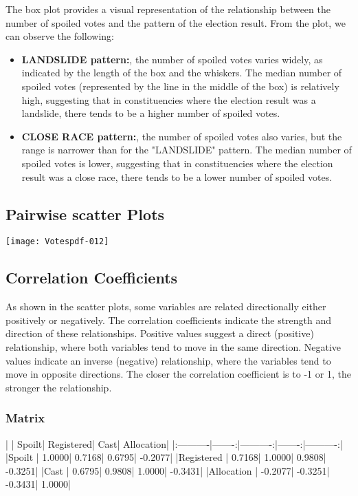 \documentclass[fleqn,a4paper,12pt]{article}
\begin{document}
The box plot provides a visual representation of the relationship between the number of spoiled votes and the pattern of the election result.
From the plot, we can observe the following:
\begin{itemize}
\item \textbf{LANDSLIDE pattern:}, the number of spoiled votes varies widely, as indicated by the length of the box and the whiskers. The median number of spoiled votes (represented by the line in the middle of the box) is relatively high, suggesting that in constituencies where the election result was a landslide, there tends to be a higher number of spoiled votes.
\item \textbf{CLOSE RACE pattern:}, the number of spoiled votes also varies, but the range is narrower than for the "LANDSLIDE" pattern. The median number of spoiled votes is lower, suggesting that in constituencies where the election result was a close race, there tends to be a lower number of spoiled votes.
\end{itemize}
 

\subsection{Pairwise scatter Plots}

\texttt{[image: Votespdf-012]}

\subsection{Correlation Coefficients}

As shown in the scatter plots, some variables are related directionally either positively or negatively. The correlation coefficients indicate the strength and direction of these relationships. Positive values suggest a direct (positive) relationship, where both variables tend to move in the same direction. Negative values indicate an inverse (negative) relationship, where the variables tend to move in opposite directions. The closer the correlation coefficient is to -1 or 1, the stronger the relationship.
\newpage
\subsubsection{Matrix}
\begin{Schunk}
\begin{Soutput}
|           |  Spoilt| Registered|    Cast| Allocation|
|:----------|-------:|----------:|-------:|----------:|
|Spoilt     |  1.0000|     0.7168|  0.6795|    -0.2077|
|Registered |  0.7168|     1.0000|  0.9808|    -0.3251|
|Cast       |  0.6795|     0.9808|  1.0000|    -0.3431|
|Allocation | -0.2077|    -0.3251| -0.3431|     1.0000|
\end{Soutput}
\end{Schunk}
\end{document}
